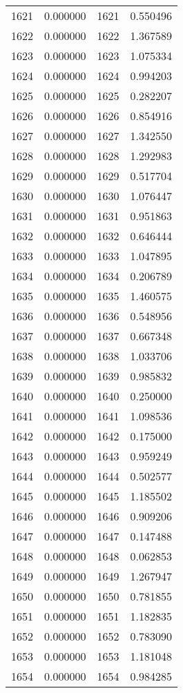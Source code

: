 \documentclass[12pt]{article}
\begin{document}
\begin{longtable}{@{}cccc@{}}
1621 & 0.000000 & 1621 & 0.550496 \\
1622 & 0.000000 & 1622 & 1.367589 \\
1623 & 0.000000 & 1623 & 1.075334 \\
1624 & 0.000000 & 1624 & 0.994203 \\
1625 & 0.000000 & 1625 & 0.282207 \\
1626 & 0.000000 & 1626 & 0.854916 \\
1627 & 0.000000 & 1627 & 1.342550 \\
1628 & 0.000000 & 1628 & 1.292983 \\
1629 & 0.000000 & 1629 & 0.517704 \\
1630 & 0.000000 & 1630 & 1.076447 \\
1631 & 0.000000 & 1631 & 0.951863 \\
1632 & 0.000000 & 1632 & 0.646444 \\
1633 & 0.000000 & 1633 & 1.047895 \\
1634 & 0.000000 & 1634 & 0.206789 \\
1635 & 0.000000 & 1635 & 1.460575 \\
1636 & 0.000000 & 1636 & 0.548956 \\
1637 & 0.000000 & 1637 & 0.667348 \\
1638 & 0.000000 & 1638 & 1.033706 \\
1639 & 0.000000 & 1639 & 0.985832 \\
1640 & 0.000000 & 1640 & 0.250000 \\
1641 & 0.000000 & 1641 & 1.098536 \\
1642 & 0.000000 & 1642 & 0.175000 \\
1643 & 0.000000 & 1643 & 0.959249 \\
1644 & 0.000000 & 1644 & 0.502577 \\
1645 & 0.000000 & 1645 & 1.185502 \\
1646 & 0.000000 & 1646 & 0.909206 \\
1647 & 0.000000 & 1647 & 0.147488 \\
1648 & 0.000000 & 1648 & 0.062853 \\
1649 & 0.000000 & 1649 & 1.267947 \\
1650 & 0.000000 & 1650 & 0.781855 \\
1651 & 0.000000 & 1651 & 1.182835 \\
1652 & 0.000000 & 1652 & 0.783090 \\
1653 & 0.000000 & 1653 & 1.181048 \\
1654 & 0.000000 & 1654 & 0.984285 \\

\end{longtable}
\end{document}
